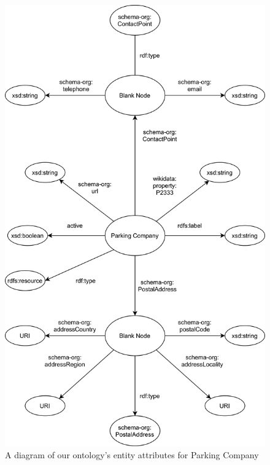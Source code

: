 \begin{figure}[H]
	\centering
	\includegraphics[scale=0.18]{figures/parking-company-attributes.png}
	\caption{A diagram of our ontology's entity attributes for Parking Company} 
\end{figure}
